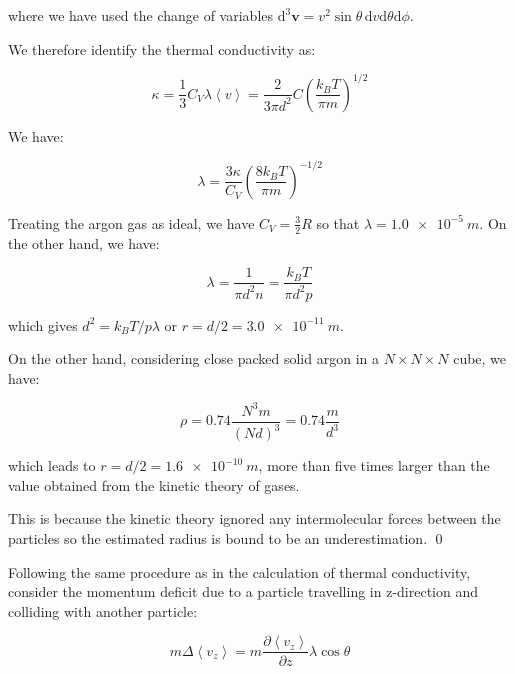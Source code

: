 \documentclass[12pt]{article}
\begin{document}
where we have used the change of variables $\mathrm{d}^{3} \mathbf{v} = v^{2} \sin{\theta} \, \mathrm{d}v \mathrm{d}\theta \mathrm{d}\phi$.

We therefore identify the thermal conductivity as:

\begin{equation}
    \kappa = \frac{1}{3} C_{V} \lambda \left\langle v \right\rangle = \frac{2}{3\pi d^{2}} C \left( \frac{k_{B}T}{\pi m} \right)^{1/2}
\end{equation}


We have:

\begin{equation}
    \lambda = \frac{3\kappa}{C_{V}} \left( \frac{8k_{B}T}{\pi m} \right)^{-1/2}
\end{equation}

Treating the argon gas as ideal, we have $C_{V} = \frac{3}{2} R$ so that $\lambda = \qty{1.0e-5}{m}$. On the other hand, we have:

\begin{equation}
    \lambda = \frac{1}{\pi d^{2} n} = \frac{k_{B}T}{\pi d^{2} p}
\end{equation}

which gives $d^{2} = k_{B}T/p\lambda$ or $r = d/2 = \qty{3.0e-11}{m}$.

On the other hand, considering close packed solid argon in a $N\times N\times N$ cube, we have:

\begin{equation}
    \rho = 0.74 \frac{N^{3}m}{(Nd)^{3}} = 0.74 \frac{m}{d^{3}}
\end{equation}

which leads to $r = d/2 = \qty{1.6e-10}{m}$, more than five times larger than the value obtained from the kinetic theory of gases.

This is because the kinetic theory ignored any intermolecular forces between the particles so the estimated radius is bound to be an underestimation.
\qed



Following the same procedure as in the calculation of thermal conductivity, consider the momentum deficit due to a particle travelling in z-direction and colliding with another particle:

\begin{equation}
    m \Delta \left\langle v_{z} \right\rangle = m \frac{\partial \left\langle v_{z} \right\rangle}{\partial z} \lambda \cos{\theta}
\end{equation}
\end{document}
